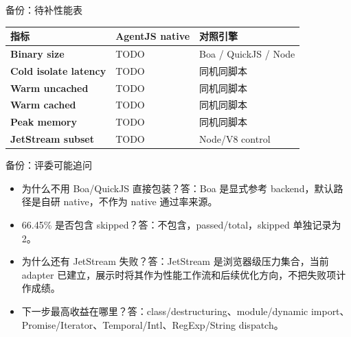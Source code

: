 \documentclass[aspectratio=169,UTF8,fontset=windows]{ctexbeamer}
\begin{document}
\begin{frame}{备份：待补性能表}
  \begin{tabularx}{\textwidth}{>{\bfseries}p{} X X}
    \toprule
    指标 & AgentJS native & 对照引擎 \\
    \midrule
    Binary size & TODO & Boa / QuickJS / Node \\
    Cold isolate latency & TODO & 同机同脚本 \\
    Warm uncached & TODO & 同机同脚本 \\
    Warm cached & TODO & 同机同脚本 \\
    Peak memory & TODO & 同机同脚本 \\
    JetStream subset & TODO & Node/V8 control \\
    \bottomrule
  \end{tabularx}
\end{frame}

\begin{frame}{备份：评委可能追问}
  \begin{itemize}
    \item 为什么不用 Boa/QuickJS 直接包装？答：Boa 是显式参考 backend，默认路径是自研 native，不作为 native 通过率来源。
    \item 66.45\% 是否包含 skipped？答：不包含，passed/total，skipped 单独记录为 2。
    \item 为什么还有 JetStream 失败？答：JetStream 是浏览器级压力集合，当前 adapter 已建立，展示时将其作为性能工作流和后续优化方向，不把失败项计作成绩。
    \item 下一步最高收益在哪里？答：class/destructuring、module/dynamic import、Promise/Iterator、Temporal/Intl、RegExp/String dispatch。
  \end{itemize}
\end{frame}
\end{document}

